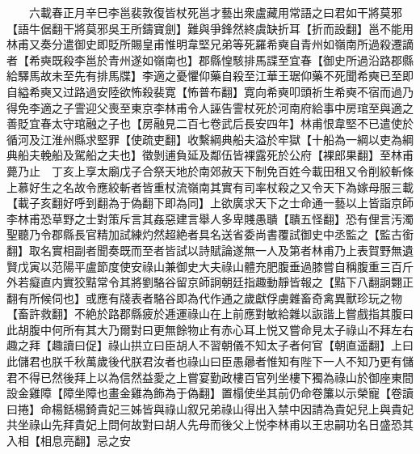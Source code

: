 　　六載春正月辛巳李邕裴敦復皆杖死邕才藝出衆盧藏用常語之曰君如干將莫邪【語牛倨翻干將莫邪吳王所鑄寶劍】難與爭鋒然終虞缺折耳【折而設翻】邕不能用林甫又奏分遣御史即貶所賜皇甫惟明韋堅兄弟等死羅希奭自青州如嶺南所過殺遷謫者【希奭既殺李邕於青州遂如嶺南也】郡縣惶駭排馬諜至宜春【御史所過沿路郡縣給驛馬故未至先有排馬牒】李適之憂懼仰藥自殺至江華王琚仰藥不死聞希奭已至即自縊希奭又过路過安陸欲怖殺裴寛【怖普布翻】寛向希奭叩頭祈生希奭不宿而過乃得免李適之子霅迎父喪至東京李林甫令人誣告霅杖死於河南府給事中房琯至與適之善貶宜春太守琯融之子也【房融見二百七卷武后長安四年】林甫恨韋堅不已遣使於循河及江淮州縣求堅罪【使疏吏翻】收繫綱典船夫溢於牢獄【十船為一綱以吏為綱典船夫輓船及駕船之夫也】徵剝逋負延及鄰伍皆裸露死於公府【裸郎果翻】至林甫薨乃止　丁亥上享太廟戊子合祭天地於南郊赦天下制免百姓今載田租又令削絞斬條上慕好生之名故令應絞斬者皆重杖流嶺南其實有司率杖殺之又令天下為嫁母服三載【載子亥翻好呼到翻為于偽翻下即為同】上欲廣求天下之士命通一藝以上皆詣京師李林甫恐草野之士對策斥言其姦惡建言舉人多卑賤愚聵【聵五怪翻】恐有俚言汚濁聖聽乃令郡縣長官精加試練灼然超絶者具名送省委尚書覆試御史中丞監之【監古銜翻】取名實相副者聞奏既而至者皆試以詩賦論遂無一人及第者林甫乃上表賀野無遺賢戊寅以范陽平盧節度使安祿山兼御史大夫祿山體充肥腹垂過膝嘗自稱腹重三百斤外若癡直内實狡黠常令其將劉駱谷留京師詗朝廷指趣動靜皆報之【黠下八翻詗翾正翻有所候伺也】或應有牋表者駱谷即為代作通之歲獻俘虜雜畜奇禽異獸珍玩之物【畜許救翻】不絶於路郡縣疲於逓運祿山在上前應對敏給雜以詼諧上嘗戲指其腹曰此胡腹中何所有其大乃爾對曰更無餘物止有赤心耳上悦又嘗命見太子祿山不拜左右趣之拜【趣讀曰促】祿山拱立曰臣胡人不習朝儀不知太子者何官【朝直遥翻】上曰此儲君也朕千秋萬歲後代朕君汝者也祿山曰臣愚曏者惟知有陛下一人不知乃更有儲君不得已然後拜上以為信然益愛之上嘗宴勤政樓百官列坐樓下獨為祿山於御座東間設金雞障【障坐障也畫金雞為飾為于偽翻】置榻使坐其前仍命卷簾以示榮寵【卷讀曰捲】命楊銛楊錡貴妃三姊皆與祿山叙兄弟祿山得出入禁中因請為貴妃兒上與貴妃共坐祿山先拜貴妃上問何故對曰胡人先母而後父上悦李林甫以王忠嗣功名日盛恐其入相【相息亮翻】忌之安

